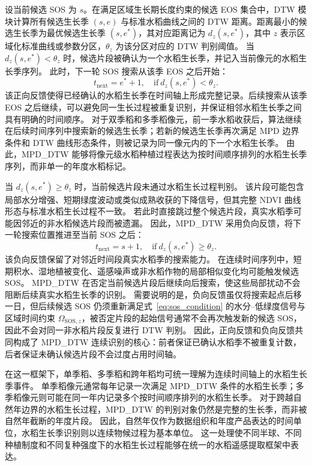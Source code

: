 设当前候选 SOS 为 \(s\)。在满足区域生长期长度约束的候选 EOS 集合中，DTW 模块计算所有候选生长季 \((s,e)\) 与标准水稻曲线之间的 DTW 距离。距离最小的候选生长季为最优候选生长季 \((s,e^{*})\)，其对应距离记为 \(d_z(s,e^{*})\)，其中 \(z\) 表示区域化标准曲线或参数分区，\(\theta_z\) 为该分区对应的 DTW 判别阈值。
当 \(d_z(s,e^{*})<\theta_z\) 时，候选片段被确认为一个水稻生长季，并记入当前像元的水稻生长季序列。
此时，下一轮 SOS 搜索从该季 EOS 之后开始：
\begin{equation}
    t_{\mathrm{next}}=e^{*}+1,\quad \mathrm{if}\ d_z(s,e^{*})<\theta_z.
    \label{eq:positive_feedback}
\end{equation}
该正向反馈使得已经确认的水稻生长季在时间轴上形成完整记录。后续搜索从该季 EOS 之后继续，可以避免同一生长过程被重复识别，并保证相邻水稻生长季之间具有明确的时间顺序。
对于双季稻和多季稻像元，前一季水稻收获后，算法继续在后续时间序列中搜索新的候选生长季；若新的候选生长季再次满足 MPD 边界条件和 DTW 曲线形态条件，则被记录为同一像元内的下一个水稻生长季。
由此，MPD\_DTW 能够将像元级水稻种植过程表达为按时间顺序排列的水稻生长季序列，而非单一的年度水稻标记。

当 \(d_z(s,e^{*})\geq\theta_z\) 时，当前候选片段未通过水稻生长过程判别。
该片段可能包含局部水分增强、短期绿度波动或类似成熟收获的下降信号，但其完整 NDVI 曲线形态与标准水稻生长过程不一致。
若此时直接跳过整个候选片段，真实水稻季可能因邻近的非水稻候选片段而被遗漏。
因此，MPD\_DTW 采用负向反馈，将下一轮搜索位置推进至当前 SOS 之后：
\begin{equation}
    t_{\mathrm{next}}=s+1,\quad \mathrm{if}\ d_z(s,e^{*})\geq\theta_z.
    \label{eq:negative_feedback}
\end{equation}
该负向反馈保留了对邻近时间段真实水稻季的搜索能力。
在连续时间序列中，短期积水、湿地植被变化、遥感噪声或非水稻作物的局部相似变化均可能触发候选 SOS。
MPD\_DTW 在否定当前候选片段后继续向后搜索，使这些局部扰动不会阻断后续真实水稻生长季的识别。
需要说明的是，负向反馈虽仅将搜索起点后移一日，但后续候选 SOS 仍须重新满足式~\ref{eq:sos_condition} 的水分--低绿度信号与区域时间约束 \(\Omega_{\mathrm{SOS},z}\)，被否定片段的起始信号通常不会再次触发新的候选 SOS，因此不会对同一非水稻片段反复进行 DTW 判别。
因此，正向反馈和负向反馈共同构成了 MPD\_DTW 连续识别的核心：前者保证已确认水稻季不被重复计数，后者保证未确认候选片段不会过度占用时间轴。

在这一框架下，单季稻、多季稻和跨年稻均可统一理解为连续时间轴上的水稻生长季事件。
单季稻像元通常每年记录一次满足 MPD\_DTW 条件的水稻生长季；多季稻像元则可能在同一年内记录多个按时间顺序排列的水稻生长季。
对于跨越自然年边界的水稻生长过程，MPD\_DTW 的判别对象仍然是完整的生长季，而非被自然年截断的年度片段。
因此，自然年仅作为数据组织和年度产品表达的时间单位，水稻生长季识别则以连续物候过程为基本单位。
这一处理使不同半球、不同种植制度和不同复种强度下的水稻生长过程能够在统一的水稻遥感提取框架中表达。

